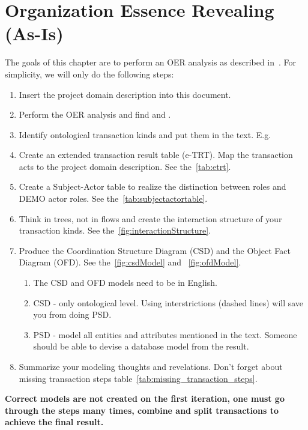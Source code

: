 \chapter{Organization Essence Revealing (As-Is)}

The goals of this chapter are to perform an OER analysis as described in~\cite{dietz2015teoo,dietz2020enterprise}. For simplicity, we will only do the following steps: 

\begin{enumerate}
    \item Insert the project domain description into this document. 
    \item Perform the OER analysis and find  and . 
    \item Identify ontological transaction kinds and put them in the text. E.g. \oact{[TK1/rq]} 
    \item Create an extended transaction result table (e-TRT). Map the transaction acts to the project domain description. See the~\cref{tab:etrt}. 
    \item Create a Subject-Actor table to realize the distinction between roles and DEMO actor roles. See the~\cref{tab:subjectactortable}. 
    \item Think in trees, not in flows and create the interaction structure of your transaction kinds. See the~\cref{fig:interactionStructure}.  
    \item Produce the Coordination Structure Diagram (CSD) and the Object Fact Diagram (OFD). See the~\cref{fig:csdModel} and ~\cref{fig:ofdModel}.  
    \begin{enumerate}
        \item The CSD and OFD models need to be in English.
        \item CSD - only ontological level. Using interstrictions (dashed lines) will save you from doing PSD. 
        \item PSD - model all entities and attributes mentioned in the text. Someone should be able to devise a database model from the result. 
    \end{enumerate}
    \item Summarize your modeling thoughts and revelations. Don't forget about missing transaction steps table~\cref{tab:missing_transaction_steps}.
\end{enumerate}

\textbf{Correct models are not created on the first iteration, one must go through the steps many times, combine and split transactions to achieve the final result. }

